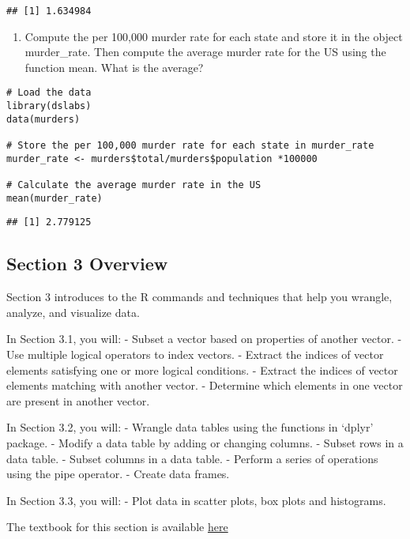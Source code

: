 \documentclass[
]{article}
\providecommand{\tightlist}{%
  \setlength{\itemsep}{0pt}\setlength{\parskip}{0pt}}
\begin{document}
\begin{verbatim}
## [1] 1.634984
\end{verbatim}

\begin{enumerate}
\def\labelenumi{\arabic{enumi}.}
\setcounter{enumi}{2}
\tightlist
\item
  Compute the per 100,000 murder rate for each state and store it in the
  object murder\_rate. Then compute the average murder rate for the US
  using the function mean. What is the average?
\end{enumerate}

\begin{verbatim}
# Load the data
library(dslabs)
data(murders)

# Store the per 100,000 murder rate for each state in murder_rate
murder_rate <- murders$total/murders$population *100000

# Calculate the average murder rate in the US 
mean(murder_rate)
\end{verbatim}

\begin{verbatim}
## [1] 2.779125
\end{verbatim}

\hypertarget{section-3-overview}{%
\subsection{Section 3 Overview}\label{section-3-overview}}

Section 3 introduces to the R commands and techniques that help you
wrangle, analyze, and visualize data.

In Section 3.1, you will: - Subset a vector based on properties of
another vector. - Use multiple logical operators to index vectors. -
Extract the indices of vector elements satisfying one or more logical
conditions. - Extract the indices of vector elements matching with
another vector. - Determine which elements in one vector are present in
another vector.

In Section 3.2, you will: - Wrangle data tables using the functions in
`dplyr' package. - Modify a data table by adding or changing columns. -
Subset rows in a data table. - Subset columns in a data table. - Perform
a series of operations using the pipe operator. - Create data frames.

In Section 3.3, you will: - Plot data in scatter plots, box plots and
histograms.

The textbook for this section is available
\href{https://rafalab.github.io/dsbook/r-basics.html\#indexing}{here}
\end{document}

